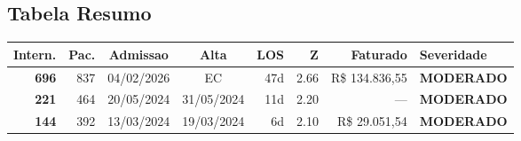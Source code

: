 \documentclass[a4paper,10pt]{article}
\begin{document}
\subsection{Tabela Resumo}
\begin{center}
\begin{longtable}{>{\scriptsize}r>{\scriptsize}r>{\scriptsize}c>{\scriptsize}c>{\scriptsize}r>{\scriptsize}r>{\scriptsize}r>{\scriptsize}l}
\toprule
\textbf{Intern.} & \textbf{Pac.} & \textbf{Admissao} & \textbf{Alta} & \textbf{LOS} & \textbf{Z} & \textbf{Faturado} & \textbf{Severidade} \\
\midrule
\endhead
\bottomrule
\endfoot

\textcolor{anomyellow}{\textbf{696}} & 837 & 04/02/2026 & \textcolor{anomorange}{EC} & 47d & \textcolor{anomyellow}{2.66} & R\$ 134.836,55 & \textcolor{anomyellow}{\textbf{MODERADO}} \\

\textcolor{anomyellow}{\textbf{221}} & 464 & 20/05/2024 & 31/05/2024 & 11d & \textcolor{anomyellow}{2.20} & --- & \textcolor{anomyellow}{\textbf{MODERADO}} \\

\textcolor{anomyellow}{\textbf{144}} & 392 & 13/03/2024 & 19/03/2024 & 6d & \textcolor{anomyellow}{2.10} & R\$ 29.051,54 & \textcolor{anomyellow}{\textbf{MODERADO}} \\

\end{longtable}\end{center}
\end{document}
